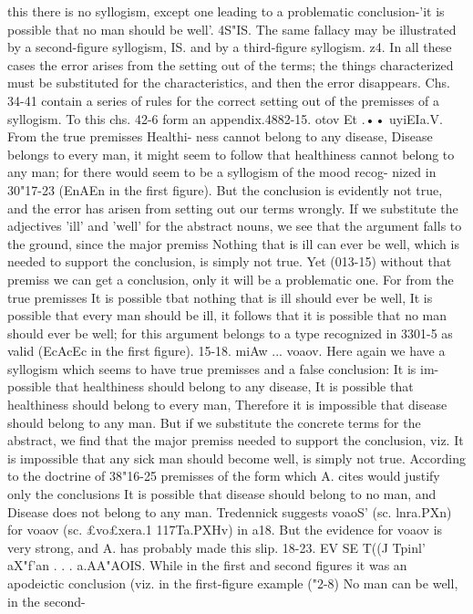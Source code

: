 {{{{{{{{{{{{{{{{{{{{{{{{{{this there is no syllogism, except one leading to a problematic
conclusion-'it is possible that no man should be well'.
4S"IS. The same fallacy may be illustrated by a second-figure
syllogism,
IS. and by a third-figure syllogism.
z4. In all these cases the error arises from the setting out of the
terms; the things characterized must be substituted for the
characteristics, and then the error disappears.
Chs. 34-41 contain a series of rules for the correct setting out of
the premisses of a syllogism. To this chs. 42-6 form an appendix.4882-15. otov Et .•• uyiEIa.V. From the true premisses Healthi-
ness cannot belong to any disease, Disease belongs to every man,
it might seem to follow that healthiness cannot belong to any
man; for there would seem to be a syllogism of the mood recog-
nized in 30"17-23 (EnAEn in the first figure). But the conclusion
is evidently not true, and the error has arisen from setting out
our terms wrongly. If we substitute the adjectives 'ill' and 'well'
for the abstract nouns, we see that the argument falls to the
ground, since the major premiss Nothing that is ill can ever be
well, which is needed to support the conclusion, is simply not
true. Yet (013-15) without that premiss we can get a conclusion,
only it will be a problematic one. For from the true premisses
It is possible tbat nothing that is ill should ever be well, It
is possible that every man should be ill, it follows that it is
possible that no man should ever be well; for this argument
belongs to a type recognized in 3301-5 as valid (EcAcEc in the
first figure).
15-18. miAw ... voaov. Here again we have a syllogism which
seems to have true premisses and a false conclusion: It is im-
possible that healthiness should belong to any disease, It is
possible that healthiness should belong to every man, Therefore
it is impossible that disease should belong to any man. But if
we substitute the concrete terms for the abstract, we find that
the major premiss needed to support the conclusion, viz. It is
impossible that any sick man should become well, is simply not
true.
According to the doctrine of 38"16-25 premisses of the form
which A. cites would justify only the conclusions It is possible
that disease should belong to no man, and Disease does not
belong to any man. Tredennick suggests voaoS' (sc. lnra.PXn) for
voaov (sc. £vo£xera.1 117Ta.PXHv) in a18. But the evidence for voaov
is very strong, and A. has probably made this slip.
18-23. EV SE T((J Tpinl' aX"f'an . . . a.AA"AOIS. While in the
first and second figures it was an apodeictic conclusion (viz. in
the first-figure example ("2-8) No man can be well, in the second-
}}}}}}}}}}}}}}}}}}}}}}}}}}
